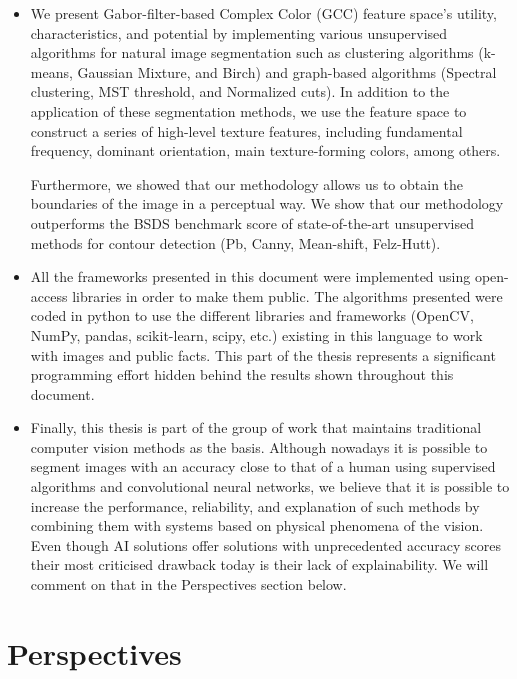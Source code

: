 \begin{itemize}
	\item We present Gabor-filter-based Complex Color (GCC) feature space's utility, characteristics, and potential by implementing various unsupervised algorithms for natural image segmentation such as clustering algorithms (k-means, Gaussian Mixture, and Birch) and graph-based algorithms (Spectral clustering, MST threshold, and Normalized cuts). In addition to the application of these segmentation methods, we use the feature space to construct a series of high-level texture features, including fundamental frequency, dominant orientation, main texture-forming colors, among others. 

Furthermore, we showed that our methodology allows us to obtain the boundaries of the image in a perceptual way. We show that our methodology outperforms the BSDS benchmark score of state-of-the-art unsupervised methods for contour detection (Pb, Canny, Mean-shift, Felz-Hutt).
	
	\item All the frameworks presented in this document were implemented using open-access libraries in order to make them public. The algorithms presented were coded in python to use the different libraries and frameworks (OpenCV, NumPy, pandas, scikit-learn, scipy, etc.) existing in this language to work with images and public facts. This part of the thesis represents a significant programming effort hidden behind the results shown throughout this document.
	
	\item Finally, this thesis is part of the group of work that maintains traditional computer vision methods as the basis. Although nowadays it is possible to segment images with an accuracy close to that of a human using supervised algorithms and convolutional neural networks, we believe that it is possible to increase the performance, reliability, and explanation of such methods by combining them with systems based on physical phenomena of the vision. Even though AI solutions offer solutions with unprecedented accuracy scores their most criticised drawback today is their lack of explainability. We will comment on that in the Perspectives section below.	
	
\end{itemize}


\section*{Perspectives}

